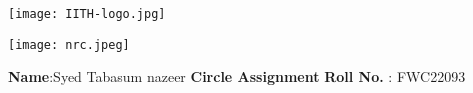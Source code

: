 \documentclass[10pt,a4paper]{report}
\begin{document}
\begin{figure*}[!tbp]
  \centering
  \begin{minipage}[b]{0.4\textwidth}
   \texttt{[image: IITH-logo.jpg]} 
  \end{minipage}
  \hfill
  \vspace{5mm}\begin{minipage}[b]{0.4\textwidth}
\raggedleft \texttt{[image: nrc.jpeg]} 
  \end{minipage}\vspace{0.2cm}
\end{figure*}
\raggedright \textbf{Name}:\hspace{1mm}Syed Tabasum nazeer\hspace{3cm} \Large \textbf{Circle Assignment}\hspace{2cm} %
\normalsize \textbf{Roll No.} :\hspace{1mm} FWC22093\vspace{1cm}
\end{document}
